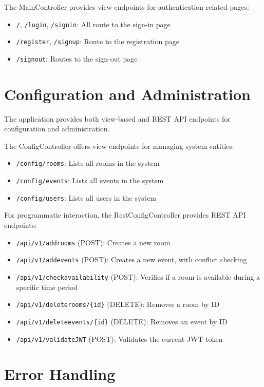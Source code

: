 The MainController provides view endpoints for authentication-related pages:
\begin{itemize}
    \item \texttt{/}, \texttt{/login}, \texttt{/signin}: All route to the sign-in page
    \item \texttt{/register}, \texttt{/signup}: Route to the registration page
    \item \texttt{/signout}: Routes to the sign-out page
\end{itemize}

\section{Configuration and Administration}\label{sec:configuration-and-administration}

The application provides both view-based and REST API endpoints for configuration and administration.

The ConfigController offers view endpoints for managing system entities:
\begin{itemize}
    \item \texttt{/config/rooms}: Lists all rooms in the system
    \item \texttt{/config/events}: Lists all events in the system
    \item \texttt{/config/users}: Lists all users in the system
\end{itemize}

For programmatic interaction, the RestConfigController provides REST API endpoints:
\begin{itemize}
    \item \texttt{/api/v1/addrooms} (POST): Creates a new room
    \item \texttt{/api/v1/addevents} (POST): Creates a new event, with conflict checking
    \item \texttt{/api/v1/checkavailability} (POST): Verifies if a room is available during a specific time period
    \item \texttt{/api/v1/deleterooms/\{id\}} (DELETE): Removes a room by ID
    \item \texttt{/api/v1/deleteevents/\{id\}} (DELETE): Removes an event by ID
    \item \texttt{/api/v1/validateJWT} (POST): Validates the current JWT token
\end{itemize}

\section{Error Handling}\label{sec:error-handling}

